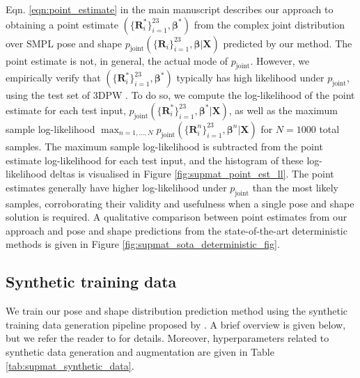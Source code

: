 Eqn. \ref{eqn:point_estimate} in the main manuscript describes our approach to obtaining a point estimate $(\{\mathbf{R}_i^*\}_{i=1}^{23},\boldsymbol{\beta}^*)$ from the complex joint distribution over SMPL pose and shape $p_\text{joint}(\{\mathbf{R}_i\}_{i=1}^{23}, \boldsymbol{\beta} | \mathbf{X})$ predicted by our method. The point estimate is not, in general, the actual mode of $p_\text{joint}$. However, we empirically verify that $(\{\mathbf{R}_i^*\}_{i=1}^{23},\boldsymbol{\beta}^*)$ typically has high likelihood under $p_\text{joint}$, using the test set of 3DPW \cite{vonMarcard2018}. To do so, we compute the log-likelihood of the point estimate for each test input, $p_\text{joint}(\{\mathbf{R}^*_i\}_{i=1}^{23}, \boldsymbol{\beta}^* | \mathbf{X})$, as well as the maximum sample log-likelihood $\max_{n=1,\ldots, N} p_\text{joint}(\{\mathbf{R}^n_i\}_{i=1}^{23}, \boldsymbol{\beta}^n | \mathbf{X})$ for $N=1000$ total samples. The maximum sample log-likelihood is subtracted from the point estimate log-likelihood for each test input, and the histogram of these log-likelihood deltas is visualised in Figure \ref{fig:supmat_point_est_ll}. The point estimates generally have higher log-likelihood under $p_\text{joint}$ than the most likely samples, corroborating their validity and usefulness when a single pose and shape solution is required. A qualitative comparison between point estimates from our approach and pose and shape predictions from the state-of-the-art deterministic methods \cite{Kocabas_PARE_2021, li2020hybrik} is given in Figure \ref{fig:supmat_sota_deterministic_fig}.

\subsection{Synthetic training data}

We train our pose and shape distribution prediction method using the synthetic training data generation pipeline proposed by \cite{sengupta2021hierprobhuman}. A brief overview is given below, but we refer the reader to \cite{sengupta2021hierprobhuman} for details. Moreover, hyperparameters related to synthetic data generation and augmentation are given in Table \ref{tab:supmat_synthetic_data}.

